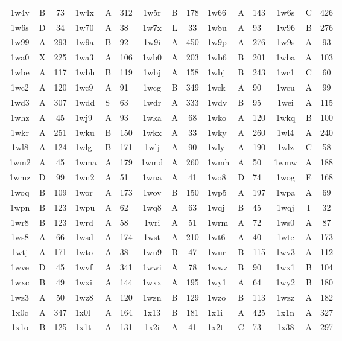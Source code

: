 \begin{longtable}{|c|c|c| a|a|a| c|c|c| a|a|a| c|c|c|}
1w4v & B & 73 & 1w4x & A & 312 & 1w5r & B & 178 & 1w66 & A & 143 & 1w6s & C & 426\\
1w6s & D & 34 & 1w70 & A & 38 & 1w7x & L & 33 & 1w8u & A & 93 & 1w96 & B & 276\\
1w99 & A & 293 & 1w9a & B & 92 & 1w9i & A & 450 & 1w9p & A & 276 & 1w9s & A & 93\\
1wa0 & X & 225 & 1wa3 & A & 106 & 1wb0 & A & 203 & 1wb6 & B & 201 & 1wba & A & 103\\
1wbe & A & 117 & 1wbh & B & 119 & 1wbj & A & 158 & 1wbj & B & 243 & 1wc1 & C & 60\\
1wc2 & A & 120 & 1wc9 & A & 91 & 1wcg & B & 349 & 1wck & A & 90 & 1wcu & A & 99\\
1wd3 & A & 307 & 1wdd & S & 63 & 1wdr & A & 333 & 1wdv & B & 95 & 1wei & A & 115\\
1whz & A & 45 & 1wj9 & A & 93 & 1wka & A & 68 & 1wko & A & 120 & 1wkq & B & 100\\
1wkr & A & 251 & 1wku & B & 150 & 1wkx & A & 33 & 1wky & A & 260 & 1wl4 & A & 240\\
1wl8 & A & 124 & 1wlg & B & 171 & 1wlj & A & 90 & 1wly & A & 190 & 1wlz & C & 58\\
1wm2 & A & 45 & 1wma & A & 179 & 1wmd & A & 260 & 1wmh & A & 50 & 1wmw & A & 188\\
1wmz & D & 99 & 1wn2 & A & 51 & 1wna & A & 41 & 1wo8 & D & 74 & 1wog & E & 168\\
1woq & B & 109 & 1wor & A & 173 & 1wov & B & 150 & 1wp5 & A & 197 & 1wpa & A & 69\\
1wpn & B & 123 & 1wpu & A & 62 & 1wq8 & A & 63 & 1wqj & B & 45 & 1wqj & I & 32\\
1wr8 & B & 123 & 1wrd & A & 58 & 1wri & A & 51 & 1wrm & A & 72 & 1ws0 & A & 87\\
1ws8 & A & 66 & 1wsd & A & 174 & 1wst & A & 210 & 1wt6 & A & 40 & 1wte & A & 173\\
1wtj & A & 171 & 1wto & A & 38 & 1wu9 & B & 47 & 1wur & B & 115 & 1wv3 & A & 112\\
1wve & D & 45 & 1wvf & A & 341 & 1wwi & A & 78 & 1wwz & B & 90 & 1wx1 & B & 104\\
1wxc & B & 49 & 1wxi & A & 144 & 1wxx & A & 195 & 1wy1 & A & 64 & 1wy2 & B & 180\\
1wz3 & A & 50 & 1wz8 & A & 120 & 1wzn & B & 129 & 1wzo & B & 113 & 1wzz & A & 182\\
1x0c & A & 347 & 1x0l & A & 164 & 1x13 & B & 181 & 1x1i & A & 425 & 1x1n & A & 327\\
1x1o & B & 125 & 1x1t & A & 131 & 1x2i & A & 41 & 1x2t & C & 73 & 1x38 & A & 297\\

\end{longtable}
